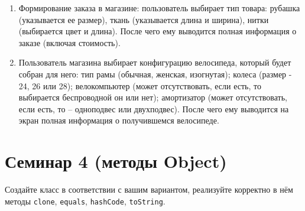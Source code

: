 \documentclass[12pt]{article}
\begin{document}
\begin{enumerate}
\item Формирование заказа в магазине: пользователь выбирает тип товара: рубашка (указывается ее размер), 
ткань (указывается длина и ширина), нитки (выбирается цвет и длина). После чего ему выводится полная информация
о заказе (включая стоимость).
\item Пользователь магазина выбирает конфигурацию велосипеда, который будет собран для него: тип рамы 
(обычная, женская, изогнутая); колеса (размер - 24, 26 или 28); велокомпьютер (может отсутствовать, если есть, то
выбирается беспроводной он или нет); амортизатор (может отсутствовать, если есть, то -- одноподвес или двухподвес). 
После чего ему выводится на экран полная информация о получившемся велосипеде.
\end{enumerate}

\section{Семинар 4 (методы Object)}

Создайте класс в соответствии с вашим вариантом, реализуйте корректно в нём
методы \texttt{clone}, \texttt{equals}, \texttt{hashCode}, \texttt{toString}.
\end{document}
